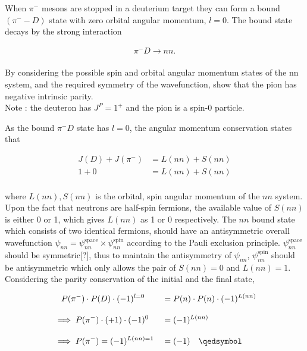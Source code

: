 \begin{problem}{11.2}
When $\pi^-$ mesons are stopped in a deuterium target they can form a bound $(\pi^--D)$ state with zero orbital angular momentum, $l = 0$. The bound state decays by the strong interaction

\begin{align*}
    \pi^-D\to nn.
\end{align*}\\
By considering the possible spin and orbital angular momentum states of the nn system, and the required symmetry of the wavefunction, show that the pion has negative intrinsic parity.\\

Note : the deuteron has $J^P =1^+$ and the pion is a spin-0 particle.
\end{problem}
\begin{solution}
As the bound $\pi^- D$ state has $l=0$, the angular momentum conservation states that 

\begin{align*}
    J(D) + J(\pi^-) &= L(nn) + S(nn) \\
    1 + 0 &= L(nn) + S(nn)
\end{align*}\\
where $L(nn),S(nn)$ is the orbital, spin angular momentum of the $nn$ system. Upon the fact that neutrons are half-spin fermions, the available value of $S(nn)$ is either 0 or 1, which gives $L(nn)$ as 1 or 0 respectively. The $nn$ bound state which consists of two identical fermions, should have an antisymmetric overall wavefunction $\psi_{nn}=\psi^{\text{space}}_{nn}\times\psi^{\text{spin}}_{nn}$ according to the Pauli exclusion principle. $\psi^{\text{space}}_{nn}$ should be symmetric[?], thus to maintain the antisymmetry of $\psi_{nn}$, $\psi^{\text{spin}}_{nn}$ should be antisymmetric which only allows the pair of $S(nn)=0$ and $L(nn)=1$. Considering the parity conservation of the initial and the final state,

\begin{alignat}{2}
   &\quad P(\pi^-)\cdot P(D) \cdot (-1)^{l=0} &&= P(n)\cdot P(n) \cdot (-1)^{L(nn)} \nonumber \\[0.12in]
   &\implies P(\pi^-) \cdot (+1) \cdot (-1)^0 &&= (-1)^{L(nn)} \nonumber  \\[0.12in]
   &\implies P(\pi^-) = (-1)^{L(nn)=1}  &&= (-1)   \nonumber \qed
\end{alignat}
\end{solution}

